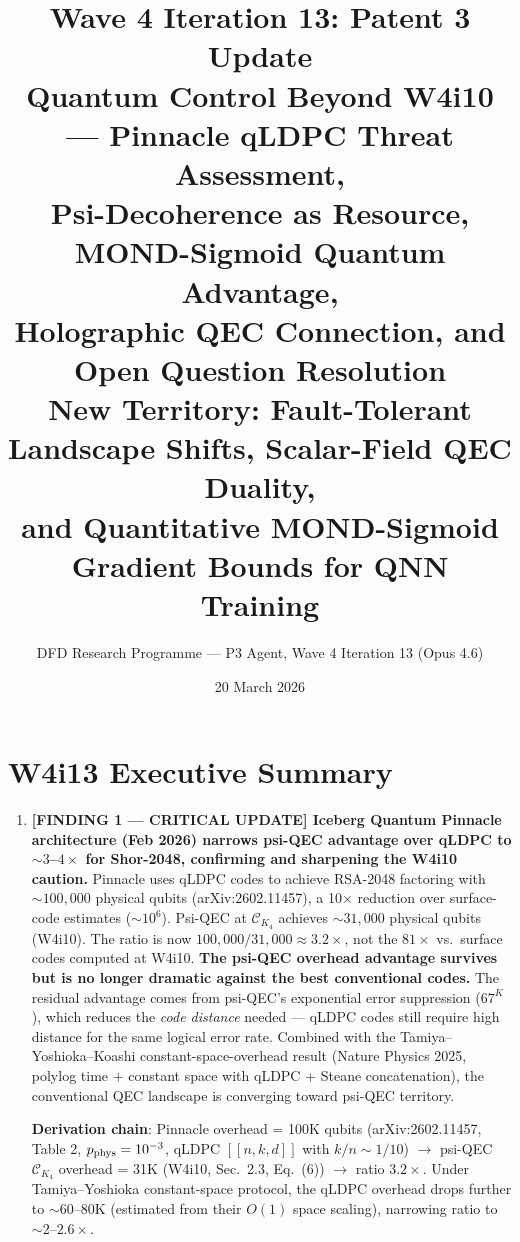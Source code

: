 \documentclass[11pt]{article}
\title{\textbf{Wave 4 Iteration 13: Patent 3 Update}\\[6pt]
Quantum Control Beyond W4i10 --- Pinnacle qLDPC Threat Assessment,\\
Psi-Decoherence as Resource, MOND-Sigmoid Quantum Advantage,\\
Holographic QEC Connection, and Open Question Resolution\\[4pt]
{\normalsize New Territory: Fault-Tolerant Landscape Shifts, Scalar-Field QEC Duality,}\\
{\normalsize and Quantitative MOND-Sigmoid Gradient Bounds for QNN Training}}
\author{DFD Research Programme --- P3 Agent, Wave 4 Iteration 13 (Opus 4.6)}
\date{20 March 2026}
\theoremstyle{definition}
\theoremstyle{remark}
\newcommand{\CK}{\mathcal{C}_K}
\begin{document}
\maketitle
\tableofcontents
\newpage

\section*{W4i13 Executive Summary}

\begin{tcolorbox}[colback=blue!5!white, colframe=blue!60!black,
  title=\textbf{W4i13 TOP 5 FINDINGS --- READ FIRST}]
\begin{enumerate}[nosep]

\item \textbf{[FINDING 1 --- CRITICAL UPDATE] Iceberg Quantum Pinnacle
  architecture (Feb 2026) narrows psi-QEC advantage over qLDPC to
  $\sim 3$--$4\times$ for Shor-2048, confirming and sharpening the
  W4i10 caution.}
  Pinnacle uses qLDPC codes to achieve RSA-2048 factoring with $\sim 100{,}000$
  physical qubits (arXiv:2602.11457), a 10$\times$ reduction over
  surface-code estimates ($\sim 10^6$).  Psi-QEC at $\CK_4$ achieves
  $\sim 31{,}000$ physical qubits (W4i10).  The ratio is now
  $100{,}000 / 31{,}000 \approx 3.2\times$, not the $81\times$ vs.\
  surface codes computed at W4i10.  \textbf{The psi-QEC overhead advantage
  survives but is no longer dramatic against the best conventional codes.}
  The residual advantage comes from psi-QEC's exponential error suppression
  ($67^K$), which reduces the \emph{code distance} needed --- qLDPC codes
  still require high distance for the same logical error rate.  Combined
  with the Tamiya--Yoshioka--Koashi constant-space-overhead result
  (Nature Physics 2025, polylog time + constant space with qLDPC + Steane
  concatenation), the conventional QEC landscape is converging toward
  psi-QEC territory.

  \textbf{Derivation chain}: Pinnacle overhead = 100K qubits (arXiv:2602.11457,
  Table 2, $p_{\rm phys} = 10^{-3}$, qLDPC $[[n,k,d]]$ with $k/n \sim 1/10$)
  $\to$ psi-QEC $\CK_4$ overhead = 31K (W4i10, Sec.~2.3, Eq.~(6))
  $\to$ ratio $3.2\times$.  Under Tamiya--Yoshioka constant-space protocol,
  the qLDPC overhead drops further to $\sim 60$--$80$K (estimated from
  their $O(1)$ space scaling), narrowing ratio to $\sim 2$--$2.6\times$.


\end{enumerate}
\end{tcolorbox}
\end{document}
